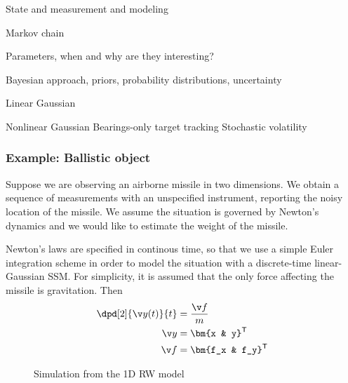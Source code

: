 State and measurement and modeling

Markov chain

Parameters, when and why are they interesting?

Bayesian approach, priors, probability distributions, uncertainty

Linear Gaussian 
  


Nonlinear Gaussian
  Bearings-only target tracking
  Stochastic volatility



 

\parencite{Murphy2002}
\subsubsection*{Example: Ballistic object}
Suppose we are observing an airborne missile in two dimensions.
We obtain a sequence of measurements with an unspecified instrument,
reporting the noisy location of the missile. We assume the situation
is governed by Newton's dynamics and we would like to estimate the weight
of the missile.

Newton's laws are specified in continous time, so that we use a simple
Euler integration scheme in order to model the situation with a discrete-time 
linear-Gaussian SSM. For simplicity, it is assumed that the only force affecting
the missile is gravitation. Then
\begin{align}
	\dpd[2]{\y(t)}{t} &= \frac{\f}{m}\\
	\y &= \bm{x & y}^\tr\\
	\f &= \bm{f_x & f_y}^\tr	
\end{align}

 
\begin{figure}[htp]
\begin{center}
  \caption{Simulation from the 1D RW model}
  \label{fig:rw1d}
\end{center}
\end{figure}
